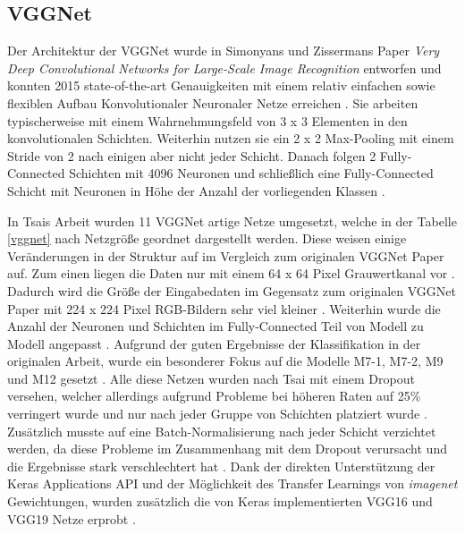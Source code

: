 \documentclass[twoside,a4paper]{IEEEtran}
\begin{document}
\subsection{VGGNet}  %
Der Architektur der VGGNet wurde in Simonyans und Zissermans Paper \textit{Very Deep Convolutional Networks for Large-Scale Image Recognition} entworfen und konnten 2015 state-of-the-art Genauigkeiten mit einem relativ einfachen sowie flexiblen Aufbau Konvolutionaler Neuronaler Netze erreichen \cite[S.1]{simonyan2015deep}. Sie arbeiten typischerweise mit einem Wahrnehmungsfeld von 3 x 3 Elementen in den konvolutionalen Schichten. Weiterhin nutzen sie ein 2 x 2 Max-Pooling mit einem Stride von 2 nach einigen aber nicht jeder Schicht. Danach folgen 2 Fully-Connected Schichten mit 4096 Neuronen und schließlich eine Fully-Connected Schicht mit Neuronen in Höhe der Anzahl der vorliegenden Klassen \cite[S.2]{simonyan2015deep}.

In Tsais Arbeit wurden 11 VGGNet artige Netze umgesetzt, welche in der Tabelle \ref{vggnet} nach Netzgröße geordnet dargestellt werden. Diese weisen einige Veränderungen in der Struktur auf im Vergleich zum originalen VGGNet Paper auf. Zum einen liegen die Daten nur mit einem 64 x 64 Pixel Grauwertkanal vor \cite[S.3]{RHC}. Dadurch wird die Größe der Eingabedaten im Gegensatz zum originalen VGGNet Paper mit 224 x 224 Pixel RGB-Bildern sehr viel kleiner \cite[S.2]{simonyan2015deep}. Weiterhin wurde die Anzahl der Neuronen und Schichten im Fully-Connected Teil von Modell zu Modell angepasst \cite[S.3]{RHC}. Aufgrund der guten Ergebnisse der Klassifikation in der originalen Arbeit, wurde ein besonderer Fokus auf die Modelle M7-1, M7-2, M9 und M12 gesetzt \cite[S.5]{RHC}. Alle diese Netzen wurden nach Tsai mit einem Dropout versehen, welcher allerdings aufgrund Probleme bei höheren Raten auf 25\% verringert wurde und nur nach jeder Gruppe von Schichten platziert wurde \cite[S.2]{RHC}. Zusätzlich musste auf eine Batch-Normalisierung nach jeder Schicht verzichtet werden, da diese Probleme im Zusammenhang mit dem Dropout verursacht und die Ergebnisse stark verschlechtert hat \cite[S.4]{RHC}. Dank der direkten Unterstützung der Keras Applications API und der Möglichkeit des Transfer Learnings von \textit{imagenet} Gewichtungen, wurden zusätzlich die von Keras implementierten VGG16 und VGG19 Netze erprobt \cite{vgg_keras}.
\end{document}
